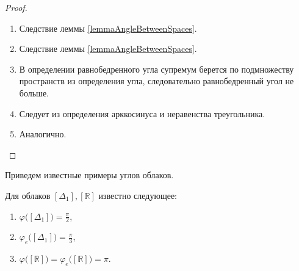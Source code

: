\begin{proof}
  \begin{enumerate}
    \item Следствие леммы \ref{lemmaAngleBetweenSpaces}.
    \item Следствие леммы \ref{lemmaAngleBetweenSpaces}.
    \item В определении равнобедренного угла супремум берется по
      подмножеству пространств из определения угла, следовательно
      равнобедренный угол не больше.
    \item Следует из определения арккосинуса и неравенства треугольника.
    \item Аналогично.
  \end{enumerate}
\end{proof}
Приведем известные примеры углов облаков.
\begin{lemma}
  Для облаков \( [\Delta _{1}], [\mathbb{R}] \) известно следующее:
  \begin{enumerate}
    \item \( \varphi \big([\Delta _{1}]\big) = \frac{\pi }{2} \),
    \item \( \varphi_e \big([\Delta _{1}]\big) = \frac{\pi }{3} \),
    \item \( \varphi \big([\mathbb{R}]\big) = \varphi_e
      \big([\mathbb{R}]\big) = \pi  \).
  \end{enumerate}
\end{lemma}
